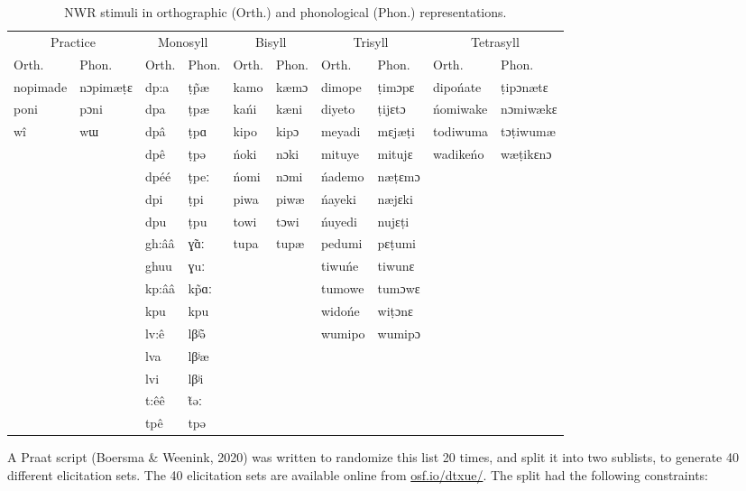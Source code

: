 \documentclass[english,,man,floatsintext]{apa6}
\begin{document}
\begin{table}

\caption{\label{tab:tabstims}NWR stimuli in orthographic (Orth.) and phonological (Phon.) representations.}
\centering
\begin{tabular}[t]{llllllllll}
\toprule
\multicolumn{2}{c}{Practice} & \multicolumn{2}{c}{Monosyll} & \multicolumn{2}{c}{Bisyll} & \multicolumn{2}{c}{Trisyll} & \multicolumn{2}{c}{Tetrasyll} \\
\cmidrule(l{3pt}r{3pt}){1-2} \cmidrule(l{3pt}r{3pt}){3-4} \cmidrule(l{3pt}r{3pt}){5-6} \cmidrule(l{3pt}r{3pt}){7-8} \cmidrule(l{3pt}r{3pt}){9-10}
Orth. & Phon. & Orth. & Phon. & Orth. & Phon. & Orth. & Phon. & Orth. & Phon.\\
\midrule
nopimade & nɔpimæṭɛ & dp:a & ṭp̃æ & kamo & kæmɔ & dimope & ṭimɔpɛ & dipońate & ṭipɔnætɛ\\
poni & pɔni & dpa & ṭpæ & kańi & kæni & diyeto & ṭijɛtɔ & ńomiwake & nɔmiwækɛ\\
wî & wɯ & dpâ & ṭpɑ & kipo & kipɔ & meyadi & mɛjæṭi & todiwuma & tɔṭiwumæ\\
 &  & dpê & ṭpə & ńoki & nɔki & mituye & mitujɛ & wadikeńo & wæṭikɛnɔ\\
 &  & dpéé & ṭpeː & ńomi & nɔmi & ńademo & næṭɛmɔ &  & \\
\addlinespace
 &  & dpi & ṭpi & piwa & piwæ & ńayeki & næjɛki &  & \\
 &  & dpu & ṭpu & towi & tɔwi & ńuyedi & nujɛṭi &  & \\
 &  & gh:ââ & ɣ̃ɑː & tupa & tupæ & pedumi & pɛṭumi &  & \\
 &  & ghuu & ɣuː &  &  & tiwuńe & tiwunɛ &  & \\
 &  & kp:ââ & kp̃ɑː &  &  & tumowe & tumɔwɛ &  & \\
\addlinespace
 &  & kpu & kpu &  &  & widońe & wiṭɔnɛ &  & \\
 &  & lv:ê & lβʲ̃ə &  &  & wumipo & wumipɔ &  & \\
 &  & lva & lβʲæ &  &  &  &  &  & \\
 &  & lvi & lβʲi &  &  &  &  &  & \\
 &  & t:êê & t̃əː &  &  &  &  &  & \\
\addlinespace
 &  & tpê & tpə &  &  &  &  &  & \\
\bottomrule
\end{tabular}
\end{table}

A Praat script (Boersma \& Weenink, 2020) was written to randomize this list 20 times, and split it into two sublists, to generate 40 different elicitation sets. The 40 elicitation sets are available online from \href{https://osf.io/dtxue/}{osf.io/dtxue/}. The split had the following constraints:
\end{document}
